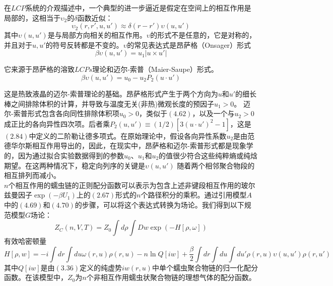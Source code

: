 在$LCP$系统的介观描述中，一个典型的进一步逼近是假定在空间上的相互作用是局部的，这相当于$\upsilon_2$的$\delta$函数近似：\\
\begin{equation}
\upsilon_{2}(r,r',u,u') \approx \delta(r-r') \upsilon(u,u')
\end{equation}
其中$\upsilon(u,u')$是与局部方向相关的相互作用。$\upsilon$的形式不是任意的，它是对称的，并且对于$u,u'$的符号反转都是不变的。$\upsilon$的常见表达式是昂萨格（Onsager）形式\\
\begin{equation}
\beta \upsilon(u,u')= u_{1}|u\times u'|
\end{equation}

它来源于昂萨格的溶致$LCPs$理论和迈尔-索普（Maier-Saupe）形式。\\
\begin{equation}
\beta \upsilon(u,u')=u_0 - u_{2} P_{2}(u \cdot u')
\end{equation}

这是热致液晶的迈尔-索普理论的基础。昂萨格形式产生于两个方向为$u$和$u'$的细长棒之间排除体积的计算，并导致与温度无关(非热)微观长度的预因子$u_{1}>0$。 迈尔-索普形式包含各向同性排除体积项$u_{0}>0$，类似于$(4.62)$，以及一个与$u_2>0$成正比的各向异性四次项。后者乘$P_{2}(u,u')\equiv (1/2)[3(u\cdot u')^2-1]$，这是$(2.84)$中定义的二阶勒让德多项式。在原始理论中，假设各向异性系数$u_2$是由范德华尔斯相互作用导出的，因此，在现实中，昂萨格和迈尔-索普形式都是现象学的，因为通过拟合实验数据得到的参数$u_0$、$u_1$和$u_2$的值很少符合这些纯粹熵或纯焓期望。在这两种情况下，稳定向列序的关键是$\upsilon (u,u')$ 随着两个相邻聚合物段的相互排列而减小。\\

$n$个相互作用的蠕虫链的正则配分函数可以表示为包含上述非键段相互作用的玻尔兹曼因子$\exp (-\beta U_1)$上的$(2.67)$形式的$n$个路径积分的乘积。通过引用模型$A$中的$(4.69)$和$(4.70)$的步骤，可以将这个表达式转换为场论。我们得到以下规范模型$G$场论：\\
\begin{equation}
Z_{C}(n,V,T)=Z_{0} \int d \rho \int D w \exp (-H[\rho,\omega])
\end{equation}
有效哈密顿量\\ 
\begin{equation}
H[\rho,w]= -i \int dr \int du \omega(r,u) \rho(r,u)-n \ln Q[i w]+\frac{\beta}{2} \int dr \int du \int du' \rho(r,u) \upsilon(u,u') \rho(r,u')
\end{equation}
其中$Q[i w]$是由$(3.36)$定义的纯虚势$i w(r,u)$中单个蠕虫聚合物链的归一化配分函数。在该模型中，$Z_0$为$n$个非相互作用蠕虫状聚合物链的理想气体的配分函数。\\

